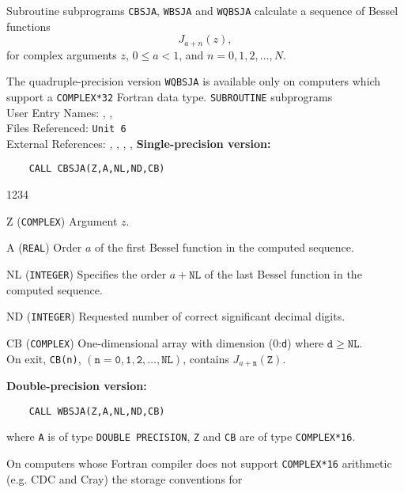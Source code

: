                     
              
\Submitter{}                         
                   
Subroutine subprograms {\tt CBSJA}, {\tt WBSJA} and {\tt WQBSJA}
calculate a sequence of Bessel functions
$$J_{a+n}(z),$$
for complex arguments $z$, $ 0\leq a<1$, and
$n=0,1,2,\ldots,N$.
\par
The quadruple-precision version {\tt WQBSJA} is available only on
computers which support a {\tt COMPLEX*32} Fortran data type.
\Structure
{\tt SUBROUTINE} subprograms\\
User Entry Names: , ,   \\
Files Referenced: {\tt Unit 6} \\
External References: , , 
, , 
\Usage
{\bf Single-precision version:}
\begin{verbatim}
    CALL CBSJA(Z,A,NL,ND,CB)
\end{verbatim}
\begin{DLtt}{1234}
\item[Z] ({\tt COMPLEX}) Argument $z$.
\item[A] ({\tt REAL}) Order $a$ of the first Bessel
function in the computed sequence.
\item[NL] ({\tt INTEGER}) Specifies the order $a+\mathtt{NL}$ of the last
Bessel function in the computed sequence.
\item [ND] ({\tt INTEGER}) Requested number of correct
significant decimal digits.
\item[CB] ({\tt COMPLEX}) One-dimensional array with dimension
(0:\texttt{d}) where $\mathtt{d \ge NL}$. \\
On exit, {\tt CB(n)}, $\mathtt{(n=0,1,2,\ldots,NL)}$,
contains $J_{a+\mathtt{n}}(\mathtt{Z})$.
\end{DLtt}
{\bf Double-precision version:}
\begin{verbatim}
    CALL WBSJA(Z,A,NL,ND,CB)
\end{verbatim}
where {\tt A} is of type {\tt DOUBLE PRECISION}, {\tt Z} and {\tt CB}
are of type {\tt COMPLEX*16}.
\par
On computers whose Fortran compiler does not support {\tt COMPLEX*16}
arithmetic (e.g. CDC and Cray) the storage conventions for
